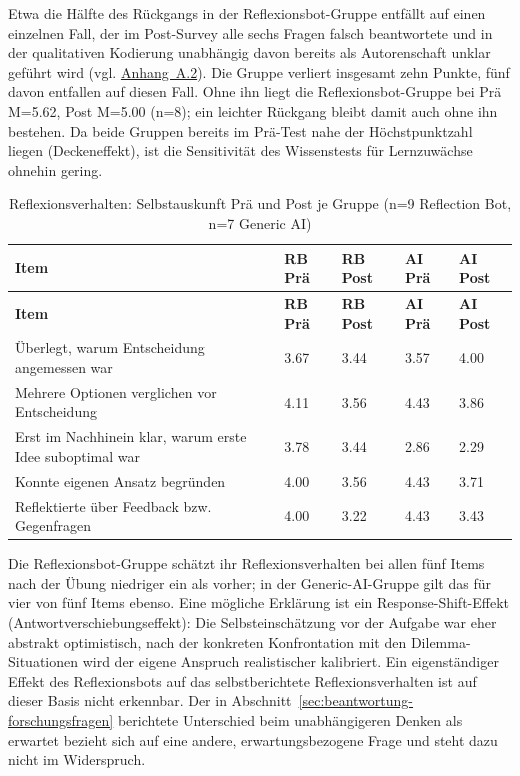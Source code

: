 Etwa die Hälfte des Rückgangs in der Reflexionsbot-Gruppe entfällt auf einen einzelnen Fall, der
im Post-Survey alle sechs Fragen falsch beantwortete und in der qualitativen Kodierung unabhängig
davon bereits als Autorenschaft \glqq unklar\grqq{} geführt wird (vgl. \hyperref[app:kodierungstabelle]{Anhang~A.2}).
Die Gruppe verliert insgesamt zehn Punkte, fünf davon entfallen auf diesen Fall. Ohne ihn
liegt die Reflexionsbot-Gruppe bei Prä M=5.62, Post M=5.00 (n=8); ein leichter Rückgang bleibt damit
auch ohne ihn bestehen. Da beide Gruppen bereits im Prä-Test nahe der Höchstpunktzahl
liegen (Deckeneffekt), ist die Sensitivität des Wissenstests für Lernzuwächse ohnehin gering.

\begingroup
\small
\setlength{\tabcolsep}{5pt}
\begin{longtable}{p{5.3cm} p{1.7cm} p{1.7cm} p{1.7cm} p{1.7cm}}
    \caption{Reflexionsverhalten: Selbstauskunft Prä und Post je Gruppe (n=9 Reflection Bot, n=7 Generic AI)}
    \label{tab:survey-reflexionsverhalten} \\
    \toprule
    \textbf{Item} & \textbf{RB Prä} & \textbf{RB Post} & \textbf{AI Prä} & \textbf{AI Post} \\
    \midrule
    \endfirsthead
    \toprule
    \textbf{Item} & \textbf{RB Prä} & \textbf{RB Post} & \textbf{AI Prä} & \textbf{AI Post} \\
    \midrule
    \endhead
    \bottomrule
    \endfoot
    Überlegt, warum Entscheidung angemessen war & 3.67 & 3.44 & 3.57 & 4.00 \\
    Mehrere Optionen verglichen vor Entscheidung & 4.11 & 3.56 & 4.43 & 3.86 \\
    Erst im Nachhinein klar, warum erste Idee suboptimal war & 3.78 & 3.44 & 2.86 & 2.29 \\
    Konnte eigenen Ansatz begründen & 4.00 & 3.56 & 4.43 & 3.71 \\
    Reflektierte über Feedback bzw. Gegenfragen & 4.00 & 3.22 & 4.43 & 3.43 \\
\end{longtable}
\endgroup

Die Reflexionsbot-Gruppe schätzt ihr Reflexionsverhalten bei allen fünf Items nach der Übung niedriger
ein als vorher; in der Generic-AI-Gruppe gilt das für vier von fünf Items ebenso. Eine mögliche
Erklärung ist ein Response-Shift-Effekt (Antwortverschiebungseffekt): Die Selbsteinschätzung vor der Aufgabe war eher
abstrakt optimistisch, nach der konkreten Konfrontation mit den Dilemma-Situationen wird der eigene
Anspruch realistischer kalibriert. Ein eigenständiger Effekt des Reflexionsbots auf das
selbstberichtete Reflexionsverhalten ist auf dieser Basis nicht erkennbar. Der in
Abschnitt~\ref{sec:beantwortung-forschungsfragen} berichtete Unterschied beim \glqq unabhängigeren
Denken als erwartet\grqq{} bezieht sich auf eine andere, erwartungsbezogene Frage und steht dazu nicht
im Widerspruch.

